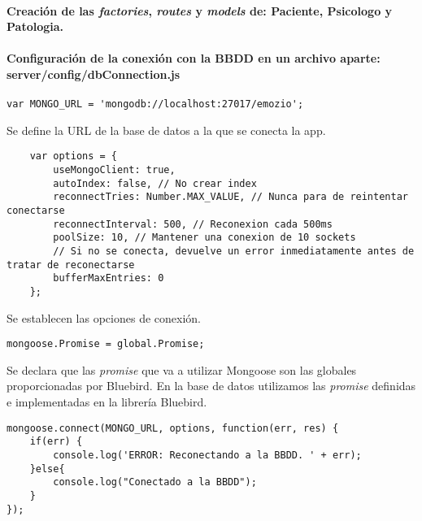  
\paragraph*{Creación de las \textit{factories}, \textit{routes} y \textit{models} de: Paciente, Psicologo y Patologia.}


 
\paragraph*{Configuración de la conexión con la BBDD en un archivo aparte: server/config/dbConnection.js}



\medskip
\begin{lstlisting}
var MONGO_URL = 'mongodb://localhost:27017/emozio';
\end{lstlisting}




Se define la URL de la base de datos a la que se conecta la app.



\medskip
\begin{lstlisting}
	var options = {
		useMongoClient: true,
		autoIndex: false, // No crear index
		reconnectTries: Number.MAX_VALUE, // Nunca para de reintentar conectarse
		reconnectInterval: 500, // Reconexion cada 500ms
		poolSize: 10, // Mantener una conexion de 10 sockets
		// Si no se conecta, devuelve un error inmediatamente antes de tratar de reconectarse
		bufferMaxEntries: 0
	};
\end{lstlisting}



Se establecen las opciones de conexión.



\medskip
\begin{lstlisting}
mongoose.Promise = global.Promise;
\end{lstlisting}



Se declara que las \textit{promise} que va a utilizar Mongoose son las globales proporcionadas por Bluebird. En la base de datos utilizamos las \textit{promise} definidas e implementadas en la librería Bluebird.



\medskip
\begin{lstlisting}
mongoose.connect(MONGO_URL, options, function(err, res) {
	if(err) {
		console.log('ERROR: Reconectando a la BBDD. ' + err);
	}else{
		console.log("Conectado a la BBDD");
	}
});
\end{lstlisting}



